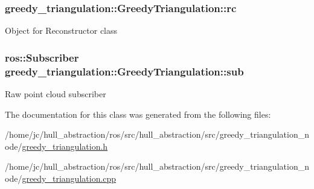 \subsubsection[{\texorpdfstring{rc}{rc}}]{ greedy\+\_\+triangulation\+::\+Greedy\+Triangulation\+::rc\hspace{0.3cm}{\ttfamily [private]}}\hypertarget{classgreedy__triangulation_1_1_greedy_triangulation_a69a1c245b9985fe03482884cf54b851d}{}\label{classgreedy__triangulation_1_1_greedy_triangulation_a69a1c245b9985fe03482884cf54b851d}
Object for Reconstructor class 
\subsubsection[{\texorpdfstring{sub}{sub}}]{\setlength{\rightskip}{0pt plus 5cm}ros\+::\+Subscriber greedy\+\_\+triangulation\+::\+Greedy\+Triangulation\+::sub\hspace{0.3cm}{\ttfamily [private]}}\hypertarget{classgreedy__triangulation_1_1_greedy_triangulation_afb3a088f4a5b177363eae83a1187ed58}{}\label{classgreedy__triangulation_1_1_greedy_triangulation_afb3a088f4a5b177363eae83a1187ed58}
Raw point cloud subscriber 

The documentation for this class was generated from the following files\+:\begin{DoxyCompactItemize}
\item 
/home/jc/hull\+\_\+abstraction/ros/src/hull\+\_\+abstraction/src/greedy\+\_\+triangulation\+\_\+node/\hyperlink{greedy__triangulation_8h}{greedy\+\_\+triangulation.\+h}\item 
/home/jc/hull\+\_\+abstraction/ros/src/hull\+\_\+abstraction/src/greedy\+\_\+triangulation\+\_\+node/\hyperlink{greedy__triangulation_8cpp}{greedy\+\_\+triangulation.\+cpp}\end{DoxyCompactItemize}
